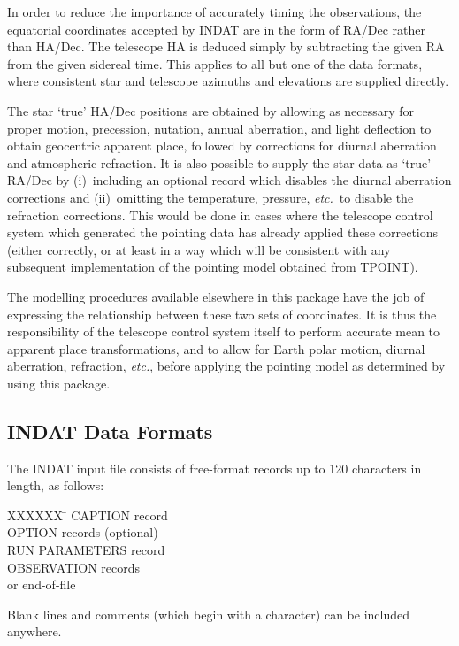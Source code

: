 In order to reduce the importance of accurately timing the
observations, the equatorial coordinates accepted by INDAT
are in the form of RA/Dec rather than HA/Dec.  The telescope HA
is deduced simply by subtracting the given RA from the given
sidereal time.  This applies to all but one of the data formats,
where consistent star and telescope azimuths and
elevations are supplied directly.

The star `true' HA/Dec positions are obtained by allowing
as necessary for proper motion, precession, nutation,
annual aberration, and light deflection to obtain geocentric apparent
place, followed by corrections for diurnal aberration and
atmospheric refraction.  It is also possible to supply the star
data as `true' RA/Dec by (i)~including
an optional record which disables the diurnal
aberration corrections and (ii)~omitting the temperature, pressure,
{\it etc.}\ to disable the refraction corrections.  This would be done
in cases where the telescope control system which generated the
pointing data has already applied these corrections (either
correctly, or at least in a way which will be consistent with
any subsequent implementation of the pointing model obtained
from TPOINT).

The modelling procedures available elsewhere in this package have
the job of expressing the relationship between these two sets of
coordinates.  It is thus the responsibility of the
telescope control system
itself to perform accurate mean to apparent place transformations,
and to allow for Earth polar motion, diurnal aberration, refraction,
{\it etc.}, before applying the pointing model as determined by using
this package.

\subsection{INDAT Data Formats}
The INDAT
input file consists of free-format records up to 120 characters
in length, as follows:
\begin{tabs}
XXXXXX \= \kill
\> CAPTION record \\
\> OPTION records (optional) \\
\> RUN PARAMETERS record \\
\> OBSERVATION records \\
\>  or end-of-file
\end{tabs}

Blank lines and comments (which begin with a \fstring{!} character)
can be included anywhere.


